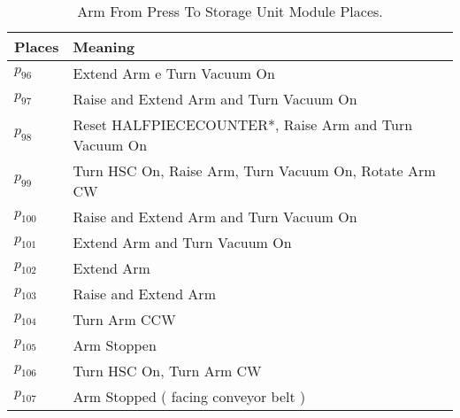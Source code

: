 \begin{table}[H]
\caption{Arm From Press To Storage Unit Module Places.}
\centering
\begin{tabular}{M{5cm}M{10cm}}
Places & Meaning\\
\hline
\hyperlink{partialNet:p961}{\hypertarget{partialTable:p96}{$p_{96}$}} & Extend Arm e Turn Vacuum On\\
\hyperlink{partialNet:p971}{\hypertarget{partialTable:p97}{$p_{97}$}} & Raise and Extend Arm and Turn Vacuum On\\
\hyperlink{partialNet:p981}{\hypertarget{partialTable:p98}{$p_{98}$}} & Reset HALFPIECECOUNTER*, Raise Arm and Turn Vacuum On\\
\hyperlink{partialNet:p991}{\hypertarget{partialTable:p99}{$p_{99}$}} & Turn HSC On, Raise Arm, Turn Vacuum On, Rotate Arm CW\\
\hyperlink{partialNet:p1001}{\hypertarget{partialTable:p100}{$p_{100}$}} & Raise and Extend Arm and Turn Vacuum On\\
\hyperlink{partialNet:p1011}{\hypertarget{partialTable:p101}{$p_{101}$}} & Extend Arm and Turn Vacuum On\\
\hyperlink{partialNet:p1021}{\hypertarget{partialTable:p102}{$p_{102}$}} & Extend Arm\\
\hyperlink{partialNet:p1031}{\hypertarget{partialTable:p103}{$p_{103}$}} & Raise and Extend Arm\\
\hyperlink{partialNet:p1041}{\hypertarget{partialTable:p104}{$p_{104}$}} & Turn Arm CCW\\
\hyperlink{partialNet:p1051}{\hypertarget{partialTable:p105}{$p_{105}$}} & Arm Stoppen\\
\hyperlink{partialNet:p1061}{\hypertarget{partialTable:p106}{$p_{106}$}} & Turn HSC On, Turn Arm CW\\
\hyperlink{partialNet:p1071}{\hypertarget{partialTable:p107}{$p_{107}$}} & Arm Stopped ( facing conveyor belt )\\
\end{tabular}
\end{table}
